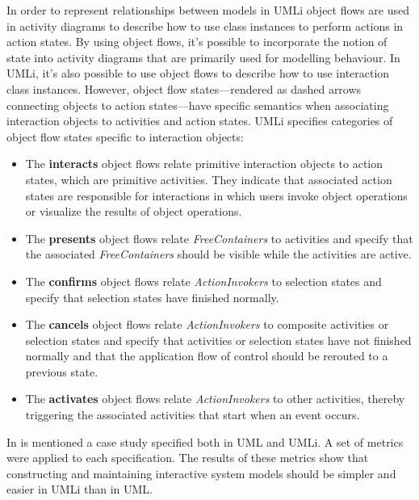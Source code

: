 In order to represent relationships between models in UMLi object flows are used in activity diagrams to describe how to use class instances to perform actions in action states. By using object flows, it's possible to incorporate the notion of state into activity diagrams that are primarily used for modelling behaviour. In UMLi, it's also possible to use object flows to describe how to use interaction class instances. However, object flow states—rendered as dashed arrows connecting objects to action states—have specific semantics when associating interaction objects to activities and action states. UMLi specifies categories of object flow states specific to interaction objects:
\begin{itemize}
\item The \textbf{interacts} object flows relate primitive interaction objects to action states, which are primitive activities. They indicate that associated action states are responsible for interactions in which users invoke object operations or visualize the results of object operations.

\item The \textbf{presents} object flows relate \textit{FreeContainers} to activities and specify
that the associated \textit{FreeContainers} should be visible while the activities are active.

\item The \textbf{confirms} object flows relate \textit{ActionInvokers} to selection states and specify that selection states have finished normally.

\item The \textbf{cancels} object flows relate \textit{ActionInvokers} to composite activities or selection states and specify that activities or selection states have not finished normally and that the application flow of control should be rerouted to a previous state.

\item The \textbf{activates} object flows relate \textit{ActionInvokers} to other activities, thereby triggering the associated activities that start when an event occurs.
\end{itemize}

In \cite{User_Interface_Modeling_in_UMLi} is mentioned a case study specified both in UML and UMLi. A set of metrics were applied to each specification. The results of these metrics show that constructing and maintaining interactive system models should be simpler and easier in UMLi than in UML.